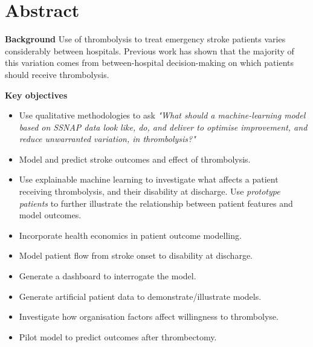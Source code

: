 \section*{Abstract} %

\textbf{Background}
Use of thrombolysis to treat emergency stroke patients varies considerably between hospitals. Previous work has shown that the majority of this variation comes from between-hospital decision-making on which patients should receive thrombolysis.

\textbf{Key objectives} %

\begin{itemize}

    \item Use qualitative methodologies to ask \textit{"What should a machine-learning model based on SSNAP data look like, do, and deliver to optimise improvement, and reduce unwarranted variation, in thrombolysis?"}

    \item Model and predict stroke outcomes and effect of thrombolysis.

    \item Use explainable machine learning to investigate what affects a patient receiving thrombolysis, and their disability at discharge. Use \textit{prototype patients} to further illustrate the relationship between patient features and model outcomes.
    
    \item Incorporate health economics in patient outcome modelling.

    \item Model patient flow from stroke onset to disability at discharge.

    \item Generate a dashboard to interrogate the model.

    \item Generate artificial patient data to demonstrate/illustrate models.

    \item Investigate how organisation factors affect willingness to thrombolyse.
    
    \item Pilot model to predict outcomes after thrombectomy.   

\end{itemize}


